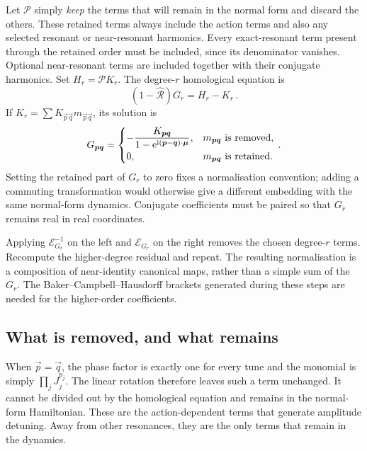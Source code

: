 Let $\mathcal P$ simply \emph{keep} the terms that will remain in the normal
form and discard the others.  These retained terms always include the action
terms and also any selected resonant or near-resonant harmonics.
Every exact-resonant term present through the retained order must be
included, since its denominator vanishes.  Optional near-resonant terms
are included together with their conjugate harmonics.
Set $H_r = \mathcal P K_r$.  The degree-$r$ homological equation is
\begin{equation}\label{eq:nnf-homological-equation}
    (1-\widehat{\mathcal R})G_r = H_r-K_r\,.
\end{equation}
If $K_r = \sum K_{\vec p\vec q}m_{\vec p\vec q}$, its solution is
\begin{equation}\label{eq:nnf-homological-solution}
    G_{\bm{p}\bm{q}} = \begin{cases}
    \displaystyle-\frac{K_{\bm{p}\bm{q}}}
    {1-\mathrm{e}^{\mathrm{i}(\bm{p}-\bm{q})\cdot\bm{\mu}}},
    &m_{\bm{p}\bm{q}}\text{ is removed},\\[1.0ex]
    0, &m_{\bm{p}\bm{q}}\text{ is retained}.
    \end{cases}\,.
\end{equation}
Setting the retained part of $G_r$ to zero fixes a normalisation convention;
adding a commuting transformation would otherwise give a different
embedding with the same normal-form dynamics.  Conjugate coefficients must
be paired so that $G_r$ remains real in real coordinates.

Applying $\mathcal E_{G_r}^{-1}$ on the left and
$\mathcal E_{G_r}$ on the right removes the chosen degree-$r$ terms.
Recompute the higher-degree residual and repeat.  The resulting
normalisation is a composition of near-identity canonical maps, rather
than a simple sum of the $G_r$.  The Baker--Campbell--Hausdorff brackets
generated during these steps are needed for the higher-order coefficients.


\subsection{What is removed, and what remains}\label{sec:nnf-what-remains}

When $\vec p = \vec q$, the phase factor is exactly one for every tune and the
monomial is simply $\prod_jJ_j^{p_j}$.  The linear rotation therefore leaves
such a term unchanged.  It cannot be divided out by the homological equation
and remains in the normal-form Hamiltonian.  These are the action-dependent
terms that generate amplitude detuning.  Away from other resonances, they are
the only terms that remain in the dynamics.

